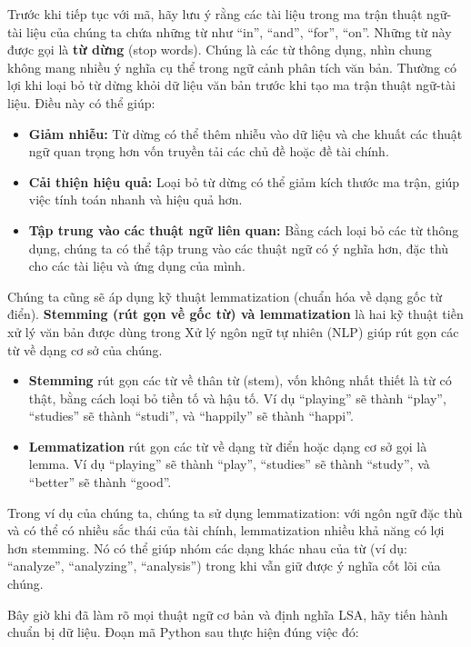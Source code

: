 Trước khi tiếp tục với mã, hãy lưu ý rằng các tài liệu trong ma trận thuật ngữ-tài liệu của chúng ta chứa những từ như ``in'', ``and'', ``for'', ``on''. Những từ này được gọi là \textbf{từ dừng} (stop words). Chúng là các từ thông dụng, nhìn chung không mang nhiều ý nghĩa cụ thể trong ngữ cảnh phân tích văn bản. Thường có lợi khi loại bỏ từ dừng khỏi dữ liệu văn bản trước khi tạo ma trận thuật ngữ-tài liệu. Điều này có thể giúp:

\begin{itemize}
  \item \textbf{Giảm nhiễu:} Từ dừng có thể thêm nhiễu vào dữ liệu và che khuất các thuật ngữ quan trọng hơn vốn truyền tải các chủ đề hoặc đề tài chính.
  \item \textbf{Cải thiện hiệu quả:} Loại bỏ từ dừng có thể giảm kích thước ma trận, giúp việc tính toán nhanh và hiệu quả hơn.
  \item \textbf{Tập trung vào các thuật ngữ liên quan:} Bằng cách loại bỏ các từ thông dụng, chúng ta có thể tập trung vào các thuật ngữ có ý nghĩa hơn, đặc thù cho các tài liệu và ứng dụng của mình.
\end{itemize}

Chúng ta cũng sẽ áp dụng kỹ thuật lemmatization (chuẩn hóa về dạng gốc từ điển). \textbf{Stemming (rút gọn về gốc từ) và lemmatization} là hai kỹ thuật tiền xử lý văn bản được dùng trong Xử lý ngôn ngữ tự nhiên (NLP) giúp rút gọn các từ về dạng cơ sở của chúng.
\begin{itemize}
  \item \textbf{Stemming} rút gọn các từ về thân từ (stem), vốn không nhất thiết là từ có thật, bằng cách loại bỏ tiền tố và hậu tố. Ví dụ ``playing'' sẽ thành ``play'', ``studies'' sẽ thành ``studi'', và ``happily'' sẽ thành ``happi''.
  \item \textbf{Lemmatization} rút gọn các từ về dạng từ điển hoặc dạng cơ sở gọi là lemma. Ví dụ ``playing'' sẽ thành ``play'', ``studies'' sẽ thành ``study'', và ``better'' sẽ thành ``good''.
\end{itemize}

Trong ví dụ của chúng ta, chúng ta sử dụng lemmatization: với ngôn ngữ đặc thù và có thể có nhiều sắc thái của tài chính, lemmatization nhiều khả năng có lợi hơn stemming. Nó có thể giúp nhóm các dạng khác nhau của từ (ví dụ: ``analyze'', ``analyzing'', ``analysis'') trong khi vẫn giữ được ý nghĩa cốt lõi của chúng.

Bây giờ khi đã làm rõ mọi thuật ngữ cơ bản và định nghĩa LSA, hãy tiến hành chuẩn bị dữ liệu. Đoạn mã Python sau thực hiện đúng việc đó:

